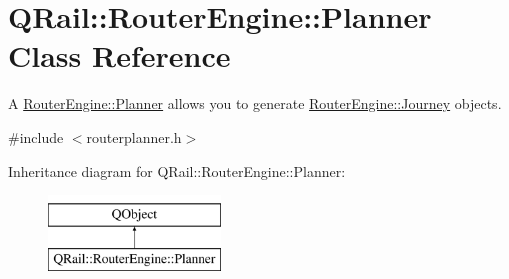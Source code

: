 \hypertarget{classQRail_1_1RouterEngine_1_1Planner}{}\section{Q\+Rail\+::Router\+Engine\+::Planner Class Reference}
\label{classQRail_1_1RouterEngine_1_1Planner}


A \mbox{\hyperlink{classQRail_1_1RouterEngine_1_1Planner}{Router\+Engine\+::\+Planner}} allows you to generate \mbox{\hyperlink{classQRail_1_1RouterEngine_1_1Journey}{Router\+Engine\+::\+Journey}} objects.  




{\ttfamily \#include $<$routerplanner.\+h$>$}

Inheritance diagram for Q\+Rail\+::Router\+Engine\+::Planner\+:\begin{figure}[H]
\begin{center}
\leavevmode
\includegraphics[height=2.000000cm]{classQRail_1_1RouterEngine_1_1Planner}
\end{center}
\end{figure}
